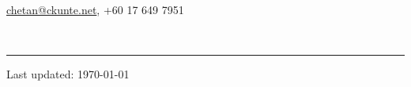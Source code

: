 \documentclass[10pt]{article}
\begin{document}
\begin{flushleft}
  \textrm{\LARGE{\theauthor}} \\
  \href{mailto:chetan@ckunte.net}{chetan@ckunte.net}, +60 17 649 7951
\end{flushleft} 




~\hrule

\begin{multicols}{2}









\end{multicols}

\vfill{}

\begin{center}
  \scriptsize{Last updated: \today}
\end{center}
\end{document}
